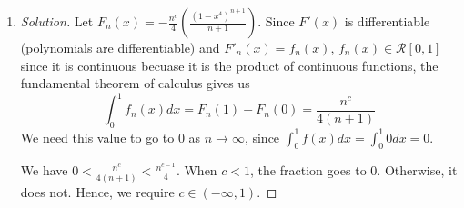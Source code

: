 \documentclass{article}
\theoremstyle{remark}
\begin{document}
\begin{enumerate}
\begin{proof}[Solution]
		We can plug in our value:
		\begin{align*}
			f_n\left(\left(\frac{3}{3+4n}\right)^{1/4}\right)
			&= n^c\left(\frac{3}{3+4n}\right)^{3/4}\left(1 - \frac{3}{3+4n}\right)^n\\
			&= n^c\left(\frac{3}{3+4n}\right)^{3/4}\left(\frac{3 + 4n - 3}{3+4n}\right)^n\\
			&= n^{c-3/4}\left(\frac{3n}{3+4n}\right)^{3/4}\left(\frac{1}{3/4n + 1}\right)^n
		\end{align*}
		Using the appropriate theorems from Rudin Chapter 3 (3.3,3.31), we can conlude
		\begin{align*}
			\lim_{n\to\infty} M_n
			&= \left(\lim_{n\to\infty} n^{c-3/4}\right)
			\left(\lim_{n\to\infty} \left(\frac{3}{4+3/n}\right)^{3/4}\right)
			\left(\lim_{n\to\infty} \left(\frac{1}{3/4n + 1}\right)^n\right)\\
			&= \left(\lim_{n\to\infty} n^{c-3/4}\right)
				\left(\frac{3}{4}\right)^{3/4}e^{-3/4}
		\end{align*}
		Hence, our function uniformly converges if and only if
		$\lim_{n\to\infty} n^{c-3/4} = 0$.
		This only occurs when $c -\frac{3}{4} < 0$ (Rudin 3.20),
		therefore our requirement is that $c \in (-\infty,3/4)$.
	\end{proof}
	\item \begin{proof}[Solution]\let\qed\relax
		Let
		$F_n(x) = -\frac{n^c}{4}\left(\frac{(1-x^4)^{n+1}}{n+1}\right)$.
		Since $F'(x)$ is differentiable (polynomials are differentiable)
		and $F'_n(x) = f_n(x)$, $f_n(x) \in \mathcal{R}[0,1]$
		since it is continuous becuase it is the product of continuous functions,
		the fundamental theorem of calculus gives us
		\[
			\int_0^1 f_n(x)dx = F_n(1) - F_n(0) = \frac{n^c}{4(n+1)}
		\]
		We need this value to go to $0$ as $n \to \infty$,
		since $\int_0^1 f(x)dx = \int_0^1 0dx = 0$.

		We have $0 < \frac{n^c}{4(n+1)} < \frac{n^{c-1}}{4}$.
		When $c < 1$, the fraction goes to $0$.
		Otherwise, it does not.
		Hence, we require $c \in (-\infty,1)$.
	\end{proof}
\end{enumerate}
\end{document}
